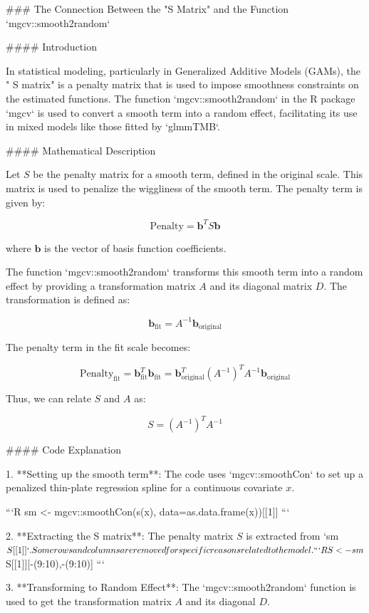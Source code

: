 ### The Connection Between the "S Matrix" and the Function `mgcv::smooth2random`

#### Introduction

In statistical modeling, particularly in Generalized Additive Models (GAMs), the "  S matrix" is a penalty matrix that is used to impose smoothness constraints on the estimated functions. The function `mgcv::smooth2random` in the R package `mgcv` is used to convert a smooth term into a random effect, facilitating its use in mixed models like those fitted by `glmmTMB`.

#### Mathematical Description

Let \( S \) be the penalty matrix for a smooth term, defined in the original scale. This matrix is used to penalize the wiggliness of the smooth term. The penalty term is given by:

\[
\text{Penalty} = \mathbf{b}^T S \mathbf{b}
\]

where \( \mathbf{b} \) is the vector of basis function coefficients.

The function `mgcv::smooth2random` transforms this smooth term into a random effect by providing a transformation matrix \( A \) and its diagonal matrix \( D \). The transformation is defined as:

\[
\mathbf{b}_{\text{fit}} = A^{-1} \mathbf{b}_{\text{original}}
\]

The penalty term in the fit scale becomes:

\[
\text{Penalty}_{\text{fit}} = \mathbf{b}_{\text{fit}}^T \mathbf{b}_{\text{fit}} = \mathbf{b}_{\text{original}}^T (A^{-1})^T A^{-1} \mathbf{b}_{\text{original}}
\]

Thus, we can relate \( S \) and \( A \) as:

\[
S = (A^{-1})^T A^{-1}
\]

#### Code Explanation

1. **Setting up the smooth term**: The code uses `mgcv::smoothCon` to set up a penalized thin-plate regression spline for a continuous covariate \( x \).

    ```R
    sm <- mgcv::smoothCon(s(x), data=as.data.frame(x))[[1]]
    ```

2. **Extracting the S matrix**: The penalty matrix \( S \) is extracted from `sm$S[[1]]`. Some rows and columns are removed for specific reasons related to the model.

    ```R
    S <- sm$S[[1]][-(9:10),-(9:10)]
    ```

3. **Transforming to Random Effect**: The `mgcv::smooth2random` function is used to get the transformation matrix \( A \) and its diagonal \( D \).

